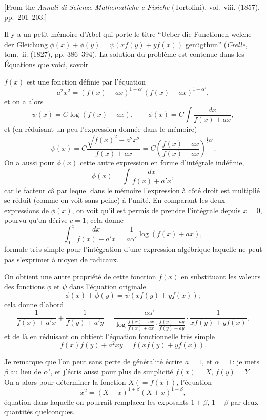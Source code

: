 \documentclass[11pt,a4paper]{book}
\theoremstyle{plain}
\begin{document}
\begin{center}
\small
[From the \textit{Annali di Scienze Mathematiche e Fisiche} (Tortolini), vol.~viii. (1857), pp.~201--203.]
\end{center}

\bigskip

Il y a un petit m\'{e}moire d'Abel qui porte le titre ``Ueber die Functionen welche der Gleichung $\phi(x)+\phi(y)=\psi(xf(y)+yf(x))$ gen\"{u}gthun'' (\textit{Crelle}, tom.~ii. (1827), pp. 386--394). La solution du probl\`{e}me est contenue dans les \'{E}quations que voici, savoir

$f(x)$ est une fonction d\'{e}finie par l'\'{e}quation
\[
a^2x^2=(f(x)-ax)^{1+\alpha'}(f(x)+ax)^{1-\alpha'},
\]
et on a alors
\[
\psi(x)=C\log(f(x)+ax),\qquad \phi(x)=C\int\frac{dx}{f(x)+ax},
\]
et (en r\'{e}duisant un peu l'expression donn\'{e}e dans le m\'{e}moire)
\[
\psi(x)=C\frac{\sqrt{f(x)^2-a^2x^2}}{f(x)+ax}
=C\left(\frac{f(x)-ax}{f(x)+ax}\right)^{\frac{1}{2}\alpha'}.
\]
On a aussi pour $\phi(x)$ cette autre expression en forme d'int\'{e}grale ind\'{e}finie,
\[
\phi(x)=\int\frac{dx}{f(x)+a'x},
\]
car le facteur $c$\^{a} par lequel dans le m\'{e}moire l'expression \`{a} c\^{o}t\'{e} droit est multipli\'{e} se r\'{e}duit (comme on voit sans peine) \`{a} l'unit\'{e}. En comparant les deux expressions de $\phi(x)$, on voit qu'il est permis de prendre l'int\'{e}grale depuis $x=0$, pourvu qu'on d\'{e}rive $c=1$; cela donne
\[
\int_0^x\frac{dx}{f(x)+a'x}=\frac{1}{a\alpha'}\log(f(x)+ax),
\]
formule tr\`{e}s simple pour l'int\'{e}gration d'une expression alg\'{e}brique laquelle ne peut pas s'exprimer \`{a} moyen de radicaux.

On obtient une autre propri\'{e}t\'{e} de cette fonction $f(x)$ en substituant les valeurs des fonctions $\phi$ et $\psi$ dans l'\'{e}quation originale
\[
\phi(x)+\phi(y)=\psi(xf(y)+yf(x));
\]
cela donne d'abord
\[
\frac{1}{f(x)+a'x}+\frac{1}{f(y)+a'y}
=\frac{a\alpha'}{\log\frac{f(x)-ax}{f(x)+ax}\cdot\frac{f(y)-ay}{f(y)+ay}}
\cdot\frac{1}{xf(y)+yf(x)},
\]
et de l\`{a} en r\'{e}duisant on obtient l'\'{e}quation fonctionnelle tr\`{e}s simple
\[
f(x)f(y)+a^2xy=f(xf(y)+yf(x)).
\]

Je remarque que l'on peut sans perte de g\'{e}n\'{e}ralit\'{e} \'{e}crire $a=1$, et $\alpha=1$: je mets $\beta$ au lieu de $\alpha'$, et j'\'{e}cris aussi pour plus de simplicit\'{e} $f(x)=X$, $f(y)=Y$. On a alors pour d\'{e}terminer la fonction $X(=f(x))$, l'\'{e}quation
\[
x^2=(X-x)^{1+\beta}(X+x)^{1-\beta},
\]
\'{e}quation dans laquelle on pourrait remplacer les exposants $1+\beta$, $1-\beta$ par deux quantit\'{e}s quelconques.
\end{document}

